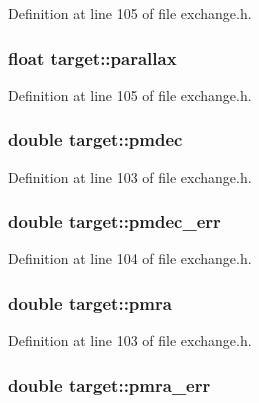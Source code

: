Definition at line 105 of file exchange.h.

\hypertarget{structtarget_afb00204e4dc631a441e3eaf5356ad152}{
\subsubsection[{parallax}]{\setlength{\rightskip}{0pt plus 5cm}float {\bf target::parallax}}}
\label{structtarget_afb00204e4dc631a441e3eaf5356ad152}


Definition at line 105 of file exchange.h.

\hypertarget{structtarget_a629ab0bc1383fb1ba302abfaeeb58b46}{
\subsubsection[{pmdec}]{\setlength{\rightskip}{0pt plus 5cm}double {\bf target::pmdec}}}
\label{structtarget_a629ab0bc1383fb1ba302abfaeeb58b46}


Definition at line 103 of file exchange.h.

\hypertarget{structtarget_a962f6069f1ae96a7e8bf775f50f3121c}{
\subsubsection[{pmdec\_\-err}]{\setlength{\rightskip}{0pt plus 5cm}double {\bf target::pmdec\_\-err}}}
\label{structtarget_a962f6069f1ae96a7e8bf775f50f3121c}


Definition at line 104 of file exchange.h.

\hypertarget{structtarget_a2325354eca9fec50369db0467e230aea}{
\subsubsection[{pmra}]{\setlength{\rightskip}{0pt plus 5cm}double {\bf target::pmra}}}
\label{structtarget_a2325354eca9fec50369db0467e230aea}


Definition at line 103 of file exchange.h.

\hypertarget{structtarget_a74858f3d4668eca8da57e70efca3e471}{
\subsubsection[{pmra\_\-err}]{\setlength{\rightskip}{0pt plus 5cm}double {\bf target::pmra\_\-err}}}
\label{structtarget_a74858f3d4668eca8da57e70efca3e471}


